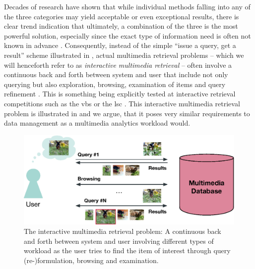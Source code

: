 Decades of research have shown that while individual methods falling into any of the three categories may yield acceptable or even exceptional results, there is clear trend indication that ultimately, a combination of the three is the most powerful solution, especially since the exact type of information need is often not known in advance \cite{Rossetto:2020interactive} . Consequently, instead of the simple ``issue a query, get a result'' scheme illustrated in , actual multimedia retrieval problems -- which we will henceforth refer to as \emph{interactive multimedia retrieval} -- often involve a continuous back and forth between system and user that include not only querying but also exploration, browsing, examination of items and query refinement \cite{Lokovc:2019Interactive,Gurrin:2019Invited}. This is something being explicitly tested at interactive retrieval competitions such as the \acrfull{vbs} \cite{Schoeffmann:2019Video} or the \acrfull{lsc} \cite{Gurrin:2021Introduction}. This interactive multimedia retrieval problem is illustrated in  and we argue, that it poses very similar requirements to data management as a multimedia analytics \cite{Chinchor:2010Multimedia} workload would.

\begin{figure}[tb]
    \centering
    \includegraphics[width=\textwidth]{figures/mr-actual.eps}
    \caption{The interactive multimedia retrieval problem: A continuous back and forth between system and user involving different types of workload as the user tries to find the item of interest through query (re-)formulation, browsing and examination.}
    \label{figure:mr-actual}
\end{figure}
 

